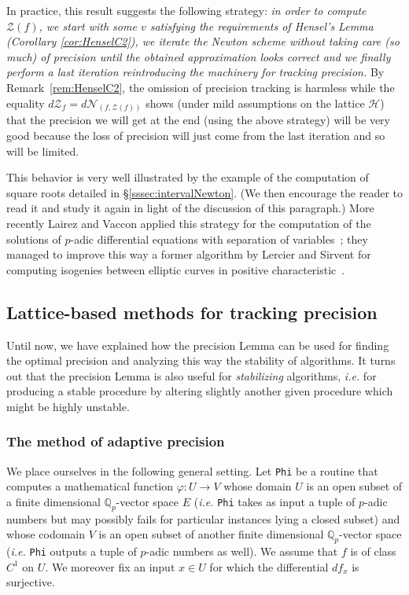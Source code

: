 \documentclass[11pt]{article}
\numberwithin{equation}{section}
\numberwithin{figure}{section}
\theoremstyle{definition}
\newcommand{\Q}{\mathbb Q}
\newcommand{\Qp}{\Q_p}
\newcommand{\calH}{\mathcal H}
\newcommand{\calN}{\mathcal N}
\newcommand{\calZ}{\mathcal Z}
\begin{document}
In practice, this result suggests the following strategy: \emph{in order 
to compute $\calZ(f)$, we start with some $v$ satisfying the 
requirements of Hensel's Lemma (Corollary \ref{cor:HenselC2}), we 
iterate the Newton scheme \emph{without taking care (so much) of 
precision} until the obtained approximation looks correct and we finally 
perform a last iteration reintroducing the machinery for tracking 
precision.}
By Remark~\ref{rem:HenselC2}, the omission of precision tracking is 
harmless while the equality $d \calZ_f = d \calN_{(f, \calZ(f))}$ shows 
(under mild assumptions on the lattice $\calH$) that the precision we 
will get at the end (using the above strategy) will be very good because 
the loss of precision will just come from the last iteration and so will 
be limited. 

This behavior is very well illustrated by the example of the 
computation of square roots detailed in \S \ref{sssec:intervalNewton}.
(We then encourage the reader to read it and study it again in light of 
the discussion of this paragraph.)
More recently Lairez and Vaccon applied this strategy for the 
computation of the solutions of $p$-adic differential equations with 
separation of variables~\cite{LaVa16}; they managed to improve this way a
former algorithm by Lercier and Sirvent for computing isogenies between 
elliptic curves in positive characteristic~\cite{LeSi08}.

\subsection{Lattice-based methods for tracking precision}
\label{ssec:latticearith}

Until now, we have explained how the precision Lemma can be used for 
finding the optimal precision and analyzing this way the stability of 
algorithms. It turns out that the precision Lemma is also useful for 
\emph{stabilizing} algorithms, \emph{i.e.} for producing a stable 
procedure by altering slightly another given procedure which might be 
highly unstable.

\subsubsection{The method of adaptive precision}
\label{sssec:adaptiveprecision}

We place ourselves in the following general setting. Let 
\texttt{Phi} be a routine that computes a mathematical function $\varphi 
: U \to V$ whose domain $U$ is an open subset of a finite dimensional 
$\Qp$-vector space $E$ (\emph{i.e.} \texttt{Phi} takes as input a tuple 
of $p$-adic numbers but may possibly fails for particular instances 
lying a closed subset) and whose codomain $V$ is an open subset of
another finite dimensional $\Qp$-vector space (\emph{i.e.} \texttt{Phi} 
outputs a tuple of $p$-adic numbers as well).
We assume that $f$ is of class $C^1$ on $U$. We moreover fix an input $x 
\in U$ for which the differential $df_x$ is surjective.
\end{document}
